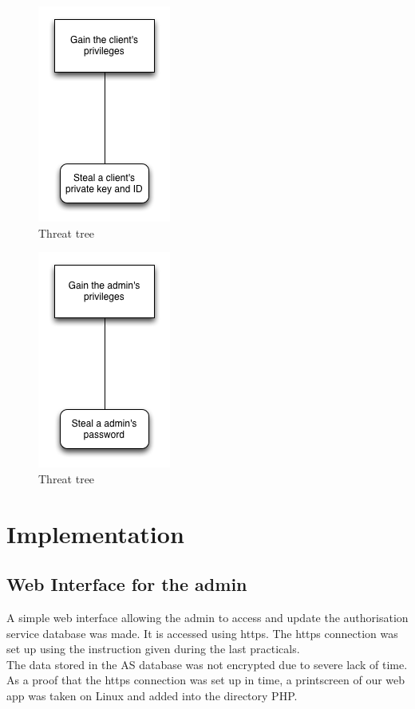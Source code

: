 \begin{figure}[H]
	\center
    \includegraphics[scale=0.5]{TT2.png}
    \caption{Threat tree}
    \label{TT2}
\end{figure}

\begin{figure}[H]
	\center
    \includegraphics[scale=0.5]{TT3.png}
    \caption{Threat tree}
    \label{TT3}
\end{figure}


\section{Implementation}
\subsection{Web Interface for the admin}
A simple web interface allowing the admin to access and update the authorisation service database was made. It is accessed using https. The https connection was set up using the instruction given during the last practicals.\\ 
The data stored in the AS database was not encrypted due to severe lack of time.
As a proof that the https connection was set up in time, a printscreen of our web app was taken on Linux and added into the directory PHP.

